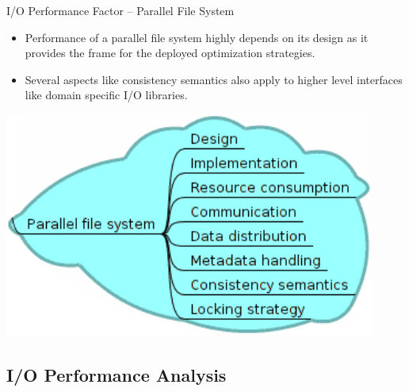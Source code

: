 \documentclass[compress,11pt,xcolor=svgnames,aspectratio=169]{beamer}
\begin{document}
\begin{frame}[fragile]{I/O Performance Factor -- Parallel File System}

\begin{itemize}
\setlength\itemsep{0.5cm}

  \item Performance of a parallel file system highly depends on its design as it provides the frame for the deployed optimization strategies.

  \item Several aspects like consistency semantics also apply to higher level interfaces like domain specific I/O libraries.

\end{itemize}


\begin{center}
\includegraphics[scale=0.5]{fig/tree-io-pfs}
\end{center}

\nocite{SOPPOAASLK13}

\end{frame}

\subsection{I/O Performance Analysis}
\end{document}
